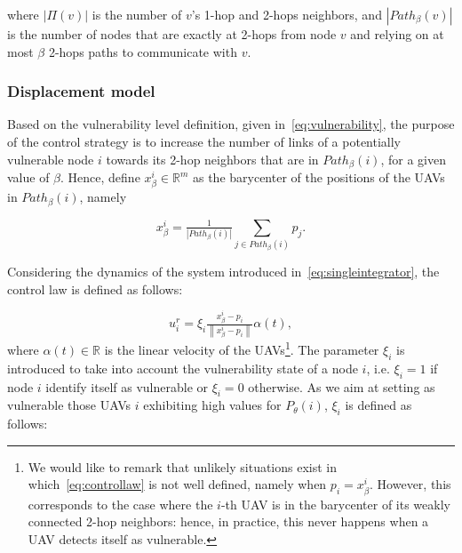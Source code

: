 where $|\Pi(v)|$ is the number of $v$'s 1-hop and 2-hops neighbors, and $|Path_{\beta}(v)|$ is the number of nodes that are exactly at 2-hops from node $v$ and relying on at most $\beta$ 2-hops paths to communicate with $v$.

\subsubsection{Displacement model}

Based on the vulnerability level definition, given in~\eqref{eq:vulnerability}, the purpose of the control strategy is to increase the number of links of a potentially vulnerable node $i$ towards its 2-hop neighbors that are in $Path_{\beta}(i)$, for a given value of $\beta$. Hence, define $x_\beta^i\in\mathbb{R}^m$ as the barycenter of the positions of the UAVs in $Path_{\beta}(i)$, namely

\begin{equation}
x_\beta^i = \tfrac{1}{\left|Path_{\beta}(i)\right|}\sum_{j\in Path_{\beta}(i)}p_j.
\label{eq:barycenter}
\end{equation}


\noindent
Considering the dynamics of the system introduced in~\eqref{eq:singleintegrator}, the control law is defined as follows:

\begin{equation}
u_i^r = \xi_i\tfrac{x_\beta^i - p_i}{\left\| x_\beta^i - p_i \right\|}\alpha\left(t\right),
\label{eq:controllaw}
\end{equation}
where $\alpha\left(t\right)\in\mathbb{R}$ is the linear velocity of the UAVs\footnote{We would like to remark that unlikely situations exist in which~\eqref{eq:controllaw} is not well defined, namely when $p_i = x_\beta^i$. However, this corresponds to the case where the $i$-th UAV is in the barycenter of its weakly connected 2-hop neighbors: hence, in practice, this never happens when a UAV detects itself as vulnerable. }.  %
The parameter $\xi_i$ is introduced to take into account the vulnerability state of a node $i$, i.e. $\xi_i=1$ if node $i$ identify itself as vulnerable or $\xi_i=0$ otherwise. As we aim at setting as vulnerable those UAVs $i$ exhibiting high values for $P_{\theta}(i)$, $\xi_i$ is defined as follows:

